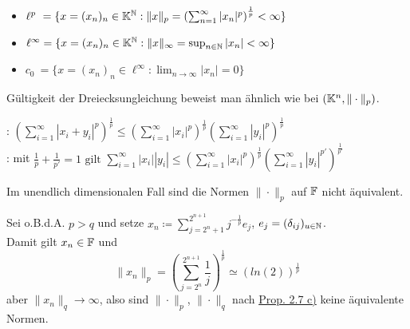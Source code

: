 \begin{beispiel}   
	\begin{itemize}
		\item $\ell^{p}~= \{ x = (x_{n})_{n} \in \mathbb{K}^{\mathbb{N}}: \|x\|_{p} = \left( \sum_{n = 1}^{\infty} | x_{n} |^{p}\right)^{\frac{1}{p}} < \infty \}$
		\item $\ell^{\infty} = \{ x = (x_{n})_{n} \in \mathbb{K}^{\mathbb{N}  }: \|x\|_{\infty} = \sup_{n \in \mathbb{N}} |x_{n}| < \infty \}$
		\item $c_{0} ~= \{ x = (x_{n})_{n} \in \ell^{\infty} : \lim_{n \rightarrow \infty} |x_{n}| = 0 \}$
	\end{itemize}
	Gültigkeit der Dreiecksungleichung beweist man ähnlich wie bei $(\mathbb{K}^{n}, \| \cdot \|_{p})$.
\end{beispiel}


\begin{lemma}
	: $\left( \sum_{i=1}^{\infty} |x_{i} + y_{i}|^p\right)^{\frac{1}{p}} \leq\left( \sum_{i=1}^{\infty} |x_{i}|^p\right)^{\frac{1}{p}} \left( \sum_{i=1}^{\infty} |y_{i}|^p\right)^{\frac{1}{p}} $	\\
	: mit $\frac{1}{p} + \frac{1}{p'} = 1 \text{ gilt } \sum_{i=1}^{\infty} |x_{i}| |y_{i}| \leq \left( \sum_{i=1}^{\infty} |x_{i}|^{p} \right)^{\frac{1}{p}} \left( \sum_{i=1}^{\infty} |y_{i}|^{p'} \right)^{\frac{1}{p'}} $	\\	
\end{lemma}


\begin{bemerkung}
	Im unendlich dimensionalen Fall sind die Normen $\| \cdot \|_{p}$ auf $\mathbb{F}$ nicht äquivalent.
	\begin{beweis}
		Sei o.B.d.A. $p > q$ und setze $x_{n} \coloneqq \sum_{j = 2^{n} + 1}^{2^{n + 1}} j^{-\frac{1}{p}}e_{j}$, $e_{j} = ( \delta_{ij} )_{u \in \mathbb{N}}$. \\
		Damit gilt $x_{n} \in \mathbb{F}$ und 
		\[ \| x_{n} \|_{p} = \left( \sum_{j = 2^{n}}^{2^{n + 1}} \frac{1}{j} \right)^{\frac{1}{p}} \simeq \left( ln(2) \right)^{\frac{1}{p}} \]
		aber $\| x_{n} \|_{q} \rightarrow \infty$, also sind $\| \cdot \|_{p}$, $\| \cdot \|_{q}$ nach \hyperref[prop:2.7]{Prop. 2.7 c)} keine äquivalente Normen.
	\end{beweis}	
\end{bemerkung}


